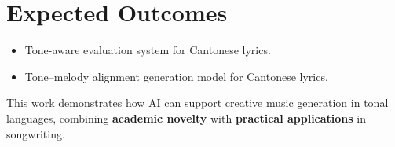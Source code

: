 \documentclass{article}
\begin{document}
\section{Expected Outcomes}
\begin{itemize}
    \item Tone-aware evaluation system for Cantonese lyrics.
    \item Tone--melody alignment generation model for Cantonese lyrics.
\end{itemize}

This work demonstrates how AI can support creative music generation in tonal languages, combining \textbf{academic novelty} with \textbf{practical applications} in songwriting.
\end{document}
